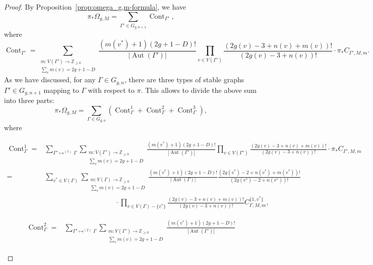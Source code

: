 \documentclass[12pt,reqno]{amsart}
\DeclareMathOperator{\Aut}{Aut}
\DeclareMathOperator{\Cont}{Cont}
\theoremstyle{plain}
\theoremstyle{definition}
\theoremstyle{remark}
\begin{document}
\begin{proof}
  By Proposition~\ref{prop:omega_g,m-formula}, we have
  \begin{equation*}
    \pi_* \Omega_{g, M} = \sum_{\Gamma'\in G_{g,n+1}} \Cont_{\Gamma'},
  \end{equation*}
  where
  \begin{equation*}
    \Cont_{\Gamma'} = \sum_{\substack{m\colon V(\Gamma') \to \mathbb Z_{\ge 0} \\ \sum_v m(v) = 2g + 1 - D}}
    \frac{(m(v^*) + 1)(2g + 1 - D)!}{|\Aut(\Gamma')|}
    \prod_{v \in V(\Gamma')} \frac{(2g(v) - 3 + n(v) + m(v))!}{(2g(v) - 3 + n(v))!} \cdot \pi_*C_{\Gamma', M, m}.
  \end{equation*}
  As we have discussed, for any $\Gamma \in G_{g, n}$, there are three types of stable graphs $\Gamma' \in G_{g, n+1}$ mapping to $\Gamma$ with respect to $\pi$.
  This allows to divide the above sum into three parts:
  \begin{equation*}
    \pi_* \Omega_{g, M} = \sum_{\Gamma\in G_{g,n}} (\Cont_{\Gamma}^1 + \Cont_{\Gamma}^2 + \Cont_{\Gamma}^3),
  \end{equation*}
  where
\begin{small}
  \begin{align*}
    \Cont_\Gamma^1 =
&
\sum_{\Gamma'\mapsto^{(1)}\Gamma}\sum_{\substack{m\colon V(\Gamma') \to \mathbb Z_{\ge 0} \\ \sum_v m(v) = 2g + 1 - D}}
    \frac{(m(v^*) + 1)(2g + 1 - D)!}{|\Aut(\Gamma')|}
    \prod_{v \in V(\Gamma')} \frac{(2g(v) - 3 + n(v) + m(v))!}{(2g(v) - 3 + n(v))!} \cdot \pi_*C_{\Gamma', M, m}
\\=&
\sum_{v^*\in V(\Gamma)}\sum_{\substack{m\colon V(\Gamma) \to \mathbb Z_{\ge 0} \\ \sum_v m(v) = 2g + 1 - D}}
    \frac{(m(v^*) + 1)(2g + 1 - D)!}{|\Aut(\Gamma)|}
   \frac{(2g(v^*) - 2 + n(v^*) + m(v^*))!}{(2g(v^*) - 2 + n(v^*))!} 
\\&\hspace{120pt}\cdot\prod_{v \in V(\Gamma)-\{v^*\}} \frac{(2g(v) - 3 + n(v) + m(v))!}{(2g(v) - 3 + n(v))!}C^{\{1,v^*\}}_{\Gamma,M,m},
    \end{align*}    
\end{small}
\begin{small}
  \begin{align*}
    \Cont_\Gamma^2 =
&
\sum_{\Gamma'\mapsto^{(2)}\Gamma}\sum_{\substack{m\colon V(\Gamma') \to \mathbb Z_{\ge 0} \\ \sum_v m(v) = 2g + 1 - D}}
    \frac{(m(v^*) + 1)(2g + 1 - D)!}{|\Aut(\Gamma')|}

\end{align*}
\end{small}
\end{proof}
\end{document}
